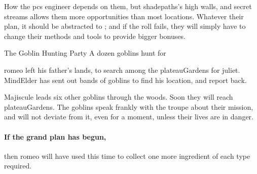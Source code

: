 How the \glspl{pc} engineer  depends on them, but \gls{shadepaths}'s high walls, and secret streams allows them more opportunities than most locations.
Whatever their plan, it should be abstracted to ; and if the roll fails, they will simply have to change their methods and tools to provide bigger bonuses.

{The Goblin Hunting Party}%
{A dozen goblins hunt for }%

\Gls{romeo} left his father's lands, to search among the \gls{plateauGardens} for \gls{juliet}.
\Gls{MindElder} has sent out bands of goblins to find his location, and report back.

Majiscule leads six other goblins through the woods.
Soon they will reach \gls{plateauGardens}.
The goblins speak frankly with the troupe about their mission, and will not deviate from it, even for a moment, unless their lives are in danger.

\paragraph{If the grand plan has begun,}
then \gls{romeo} will have used this time to collect one more \gls{ingredient} of each type required.

